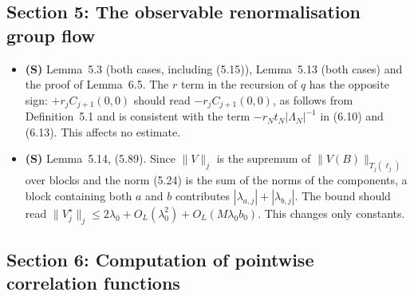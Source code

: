 \documentclass[11pt]{amsart}
\numberwithin{equation}{section}
\newcommand{\obs}{\star}
\newcommand{\Vobs}{V^\obs}
\newcommand{\OL}{O_L}
\begin{document}
\subsection*{Section 5: The observable renormalisation group flow}

\begin{itemize}
\item \textbf{(S)} Lemma~5.3 (both cases, including (5.15)), Lemma~5.13 (both cases) and the
  proof of Lemma~6.5. The $r$ term in the recursion of $q$ has the opposite sign: $+r_jC_{j+1}(0,0)$
  should read $-r_jC_{j+1}(0,0)$, as follows from Definition~5.1 and is consistent with the term
  $-r_Nt_N|\Lambda_N|^{-1}$ in (6.10) and (6.13). This affects no estimate.

\item \textbf{(S)} Lemma~5.14, (5.89). Since $\|V\|_j$ is the supremum of $\|V(B)\|_{T_j(\ell_j)}$
  over blocks and the norm (5.24) is the sum of the norms of the components, a block containing
  both $a$ and $b$ contributes $|\lambda_{a,j}|+|\lambda_{b,j}|$. The bound should read
  $\|\Vobs_j\|_j\le2\lambda_0+\OL(\lambda_0^2)+\OL(M\lambda_0b_0)$. This changes only constants.
\end{itemize}

\subsection*{Section 6: Computation of pointwise correlation functions}
\end{document}
